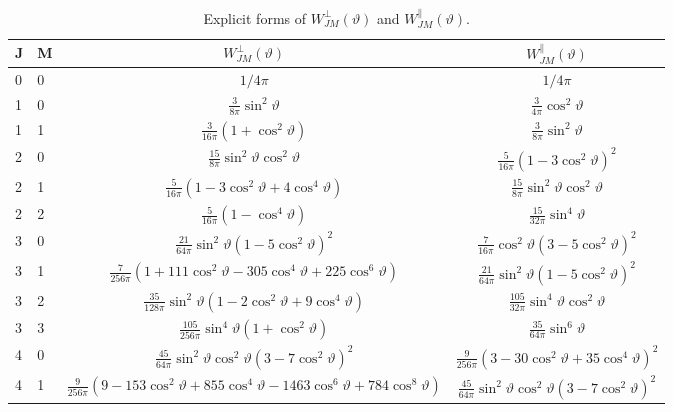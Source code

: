 \begin{table}[tbh!]
\begin{center}
\caption{Explicit forms of $W_{J M}^{\perp}(\vartheta)$ and $W_{J M}^{\|}(\vartheta)$.}
\label{chap7:tab:2}
\renewcommand{\arraystretch}{1.8}
\begin{tabular}{l|l|c|c}
\hline
J & M & $W_{J M}^{\perp}(\vartheta)$ & $W_{J M}^{\|}(\vartheta)$ \\
\hline
0 & 0 & $1 / 4 \pi$ & $1 / 4 \pi$ \\
1 & 0 & $\frac{3}{8 \pi} \sin ^{2} \vartheta$ & $\frac{3}{4 \pi} \cos ^{2} \vartheta$ \\
1 & 1 & $\frac{3}{16 \pi}\left(1+\cos ^{2} \vartheta\right)$ & $\frac{3}{8 \pi} \sin^2\vartheta$ \\
2 & 0 & $\frac{15}{8 \pi} \sin ^{2} \vartheta \cos ^{2} \vartheta$ & $\frac{5}{16 \pi}\left(1-3 \cos ^{2} \vartheta\right)^{2}$ \\
2 & 1 & $\frac{5}{16 \pi}\left(1-3 \cos ^{2} \vartheta+4 \cos ^{4} \vartheta\right)$ & $\frac{15}{8 \pi} \sin ^{2} \vartheta \cos ^{2} \vartheta$ \\
2 & 2 & $\frac{5}{16 \pi}\left(1-\cos ^{4} \vartheta\right)$ & $\frac{15}{32 \pi} \sin ^{4} \vartheta$ \\
3 & 0 & $\frac{21}{64 \pi} \sin ^{2} \vartheta\left(1-5 \cos ^{2} \vartheta\right)^{2}$ & $\frac{7}{16 \pi} \cos ^{2} \vartheta\left(3-5 \cos ^{2} \vartheta\right)^{2}$ \\
3 & 1 & $\frac{7}{256 \pi}\left(1+111 \cos ^{2} \vartheta-305 \cos ^{4} \vartheta+225 \cos ^{6} \vartheta\right)$ & $\frac{21}{64 \pi} \sin ^{2} \vartheta\left(1-5 \cos ^{2} \vartheta\right)^{2}$ \\
3 & 2 & $\frac{35}{128 \pi} \sin ^{2} \vartheta\left(1-2 \cos ^{2} \vartheta+9 \cos ^{4} \vartheta\right)$ & $\frac{105}{32 \pi} \sin ^{4} \vartheta \cos ^{2} \vartheta$ \\
3 & 3 & $\frac{105}{256 \pi} \sin ^{4} \vartheta\left(1+\cos ^{2} \vartheta\right)$ & $\frac{35}{64 \pi} \sin ^{6}\vartheta$ \\
4 & 0 & $\frac{45}{64 \pi} \sin ^{2} \vartheta \cos ^{2} \vartheta\left(3-7 \cos ^{2} \vartheta\right)^{2}$ & $\frac{9}{256 \pi}\left(3-30 \cos ^{2} \vartheta+35 \cos ^{4} \vartheta\right)^{2}$ \\
4 & 1 & $\frac{9}{256 \pi}\left(9-153 \cos ^{2} \vartheta+855 \cos ^{4} \vartheta-1463 \cos ^{6} \vartheta+784 \cos ^{8} \vartheta\right)$ & $\frac{45}{64 \pi} \sin ^{2} \vartheta \cos ^{2} \vartheta\left(3-7 \cos ^{2} \vartheta\right)^{2}$ \\

\end{tabular}
\end{center}
\end{table}
